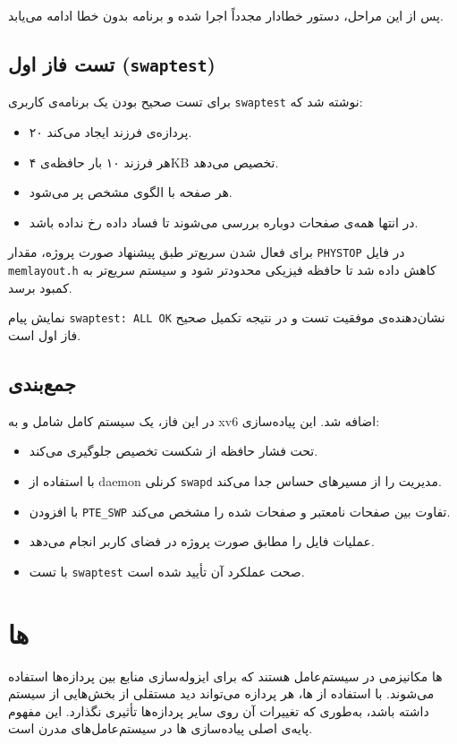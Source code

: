 \documentclass[12pt]{article}
\begin{document}
پس از این مراحل، دستور خطادار مجدداً اجرا شده و برنامه بدون خطا ادامه می‌یابد.

\subsection{تست فاز اول (\texttt{swaptest})}
برای تست صحیح بودن  یک برنامه‌ی کاربری \texttt{swaptest} نوشته شد که:
\begin{itemize}
  \item ۲۰ پردازه‌ی فرزند ایجاد می‌کند.
  \item هر فرزند ۱۰ بار حافظه‌ی ۴KB تخصیص می‌دهد.
  \item هر صفحه با الگوی مشخص پر می‌شود.
  \item در انتها همه‌ی صفحات دوباره بررسی می‌شوند تا فساد داده رخ نداده باشد.
\end{itemize}

برای فعال شدن سریع‌تر  طبق پیشنهاد صورت پروژه، مقدار \texttt{PHYSTOP} در فایل \texttt{memlayout.h} کاهش داده شد تا حافظه فیزیکی محدودتر شود و سیستم سریع‌تر به کمبود  برسد.

نمایش پیام \texttt{swaptest: ALL OK} نشان‌دهنده‌ی موفقیت تست و در نتیجه تکمیل صحیح فاز اول است.

\subsection{جمع‌بندی}
در این فاز، یک سیستم  کامل شامل  و  به xv6 اضافه شد. این پیاده‌سازی:
\begin{itemize}
  \item تحت فشار حافظه از شکست تخصیص جلوگیری می‌کند.
  \item با استفاده از daemon کرنلی \texttt{swapd} مدیریت  را از مسیرهای حساس جدا می‌کند.
  \item با افزودن \texttt{PTE\_SWP} تفاوت بین صفحات نامعتبر و صفحات  شده را مشخص می‌کند.
  \item عملیات فایل را مطابق صورت پروژه در فضای کاربر انجام می‌دهد.
  \item با تست \texttt{swaptest} صحت عملکرد آن تأیید شده است.
\end{itemize}


\section{ها}

ها مکانیزمی در سیستم‌عامل هستند که برای ایزوله‌سازی منابع بین پردازه‌ها استفاده می‌شوند. با استفاده از ها، هر پردازه می‌تواند دید مستقلی از بخش‌هایی از سیستم داشته باشد، به‌طوری که تغییرات آن روی سایر پردازه‌ها تأثیری نگذارد. این مفهوم پایه‌ی اصلی پیاده‌سازی ها در سیستم‌عامل‌های مدرن است.
\end{document}

